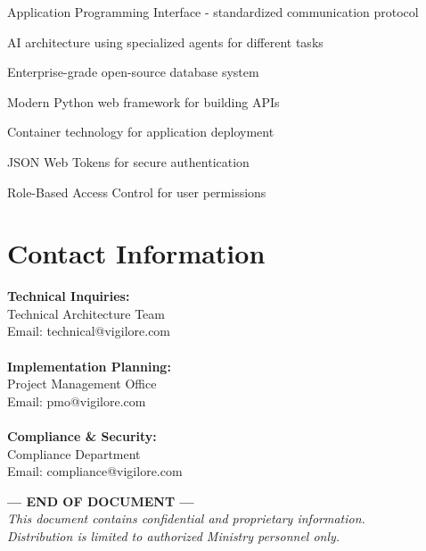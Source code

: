 \documentclass[11pt,a4paper]{article}
\begin{document}
\begin{description}[leftmargin=!,labelwidth=3cm]
    \item[API] Application Programming Interface - standardized communication protocol
    \item[Multi-Agent System] AI architecture using specialized agents for different tasks
    \item[PostgreSQL] Enterprise-grade open-source database system
    \item[FastAPI] Modern Python web framework for building APIs
    \item[Docker] Container technology for application deployment
    \item[JWT] JSON Web Tokens for secure authentication
    \item[RBAC] Role-Based Access Control for user permissions
\end{description}

\section{Contact Information}

\begin{tcolorbox}[colback=gray!10!white, colframe=govgray, sharp corners]
\textbf{Technical Inquiries:}\\
Technical Architecture Team\\
Email: technical@vigilore.com\\
\\
\textbf{Implementation Planning:}\\
Project Management Office\\
Email: pmo@vigilore.com\\
\\
\textbf{Compliance \& Security:}\\
Compliance Department\\
Email: compliance@vigilore.com
\end{tcolorbox}

\vspace{1cm}

\begin{center}
\textbf{--- END OF DOCUMENT ---}\\
\vspace{0.5cm}
\textit{This document contains confidential and proprietary information.\\
Distribution is limited to authorized Ministry personnel only.}
\end{center}
\end{document}

